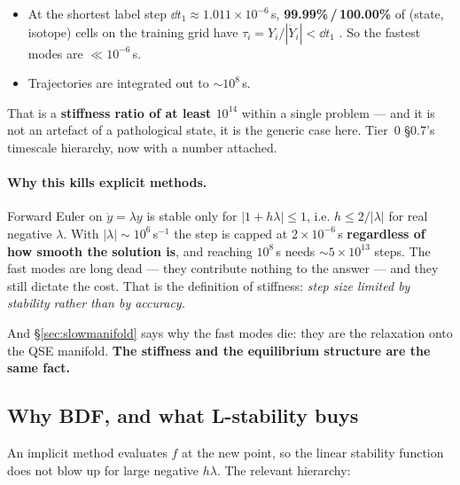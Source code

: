 \begin{itemize}
\item At the shortest label step $\dd t_1 \approx 1.011\times10^{-6}$\,s,
  \textbf{99.99\%\,/\,100.00\%} of (state, isotope) cells on the training grid
  have $\tau_i = Y_i/|\dot Y_i| < \dd t_1$ . So the
  fastest modes are $\ll 10^{-6}$\,s.
\item Trajectories are integrated out to ${\sim}10^{8}$\,s.
\end{itemize}

That is a \textbf{stiffness ratio of at least $10^{14}$} within a single problem
--- and it is not an artefact of a pathological state, it is the generic case
here. Tier~0 \S0.7's timescale hierarchy, now with a number attached.

\paragraph{Why this kills explicit methods.} Forward Euler on $\dot y = \lambda
y$ is stable only for $|1 + h\lambda| \le 1$, i.e. $h \le 2/|\lambda|$ for real
negative $\lambda$. With $|\lambda| \sim 10^{6}$\,s$^{-1}$ the step is capped at
$2\times10^{-6}$\,s \textbf{regardless of how smooth the solution is}, and
reaching $10^{8}$\,s needs ${\sim}5\times10^{13}$ steps. The fast modes are long
dead --- they contribute nothing to the answer --- and they still dictate the
cost. That is the definition of stiffness: \emph{step size limited by stability
rather than by accuracy.}

And \S\ref{sec:slowmanifold} says why the fast modes die: they are the
relaxation onto the QSE manifold. \textbf{The stiffness and the equilibrium
structure are the same fact.}

\subsection{Why BDF, and what L-stability buys}
\label{sec:bdf}

An implicit method evaluates $f$ at the new point, so the linear stability
function does not blow up for large negative $h\lambda$. The relevant hierarchy:

